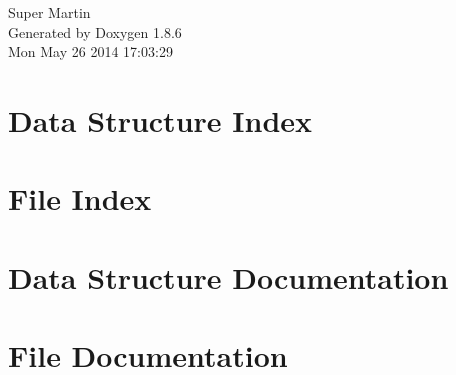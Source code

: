 \documentclass[twoside]{book}
\newcommand{\clearemptydoublepage}{%
  \newpage{\pagestyle{empty}\cleardoublepage}%
}
\begin{document}
\hypersetup{pageanchor=false}
\begin{titlepage}
\vspace*{7cm}
\begin{center}%
{\Large Super Martin }\\
\vspace*{1cm}
{\large Generated by Doxygen 1.8.6}\\
\vspace*{0.5cm}
{\small Mon May 26 2014 17:03:29}\\
\end{center}
\end{titlepage}
\clearemptydoublepage
\tableofcontents
\clearemptydoublepage
{}
\hypersetup{pageanchor=true}

\chapter{Data Structure Index}

\chapter{File Index}

\chapter{Data Structure Documentation}












\chapter{File Documentation}






































\newpage
{}
{}
\printindex
\end{document}
